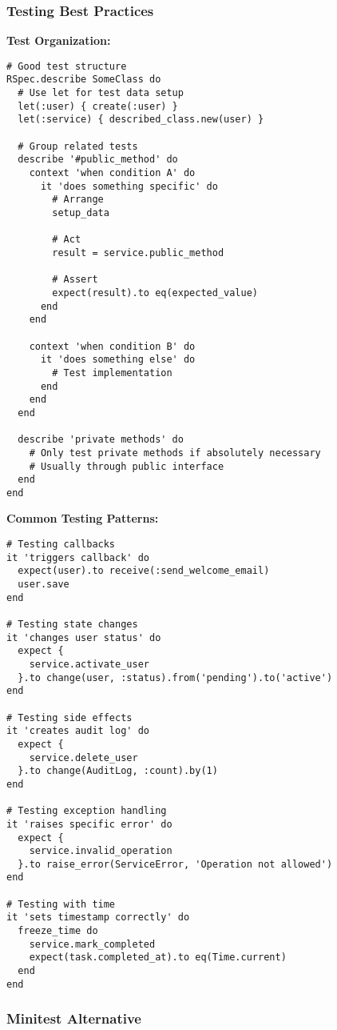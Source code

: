 \documentclass[12pt,a4paper]{article}
\begin{document}
\subsubsection{Testing Best Practices}

\textbf{Test Organization:}
\begin{lstlisting}
# Good test structure
RSpec.describe SomeClass do
  # Use let for test data setup
  let(:user) { create(:user) }
  let(:service) { described_class.new(user) }

  # Group related tests
  describe '#public_method' do
    context 'when condition A' do
      it 'does something specific' do
        # Arrange
        setup_data
        
        # Act
        result = service.public_method
        
        # Assert
        expect(result).to eq(expected_value)
      end
    end

    context 'when condition B' do
      it 'does something else' do
        # Test implementation
      end
    end
  end

  describe 'private methods' do
    # Only test private methods if absolutely necessary
    # Usually through public interface
  end
end
\end{lstlisting}

\textbf{Common Testing Patterns:}
\begin{lstlisting}
# Testing callbacks
it 'triggers callback' do
  expect(user).to receive(:send_welcome_email)
  user.save
end

# Testing state changes
it 'changes user status' do
  expect {
    service.activate_user
  }.to change(user, :status).from('pending').to('active')
end

# Testing side effects
it 'creates audit log' do
  expect {
    service.delete_user
  }.to change(AuditLog, :count).by(1)
end

# Testing exception handling
it 'raises specific error' do
  expect {
    service.invalid_operation
  }.to raise_error(ServiceError, 'Operation not allowed')
end

# Testing with time
it 'sets timestamp correctly' do
  freeze_time do
    service.mark_completed
    expect(task.completed_at).to eq(Time.current)
  end
end
\end{lstlisting}

\subsubsection{Minitest Alternative}
\end{document}
